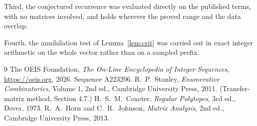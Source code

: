 \documentclass[11pt,a4paper]{article}
\theoremstyle{plain}
\theoremstyle{definition}
\begin{document}
Third, the conjectured recurrence was evaluated directly on the published terms, with no
matrices involved, and holds wherever the proved range and the data overlap.

Fourth, the annihilation test of Lemma~\ref{lem:crit} was carried out in exact integer
arithmetic on the whole vector rather than on a sampled prefix.

\begin{thebibliography}{9}
 The OEIS Foundation, \emph{The On-Line Encyclopedia of Integer
Sequences}, \url{https://oeis.org}, 2026. Sequence A223206.
 R.~P.~Stanley, \emph{Enumerative Combinatorics}, Volume 1, 2nd ed.,
Cambridge University Press, 2011. (Transfer-matrix method, Section 4.7.)
 H.~S.~M.~Coxeter, \emph{Regular Polytopes}, 3rd ed., Dover, 1973.
 R.~A.~Horn and C.~R.~Johnson, \emph{Matrix Analysis}, 2nd ed., Cambridge
University Press, 2013.
\end{thebibliography}
\end{document}
